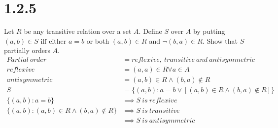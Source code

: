 \documentclass{article}
\begin{document}
\section*{1.2.5}
Let $R$ be any transitive relation over a set $A$. Define $S$ over $A$ by putting $(a,b) \in S$ iff either $a = b$ or both $(a,b) \in R$ and $\neg (b,a) \in R$. Show that $S$ partially orders $A$.
\begin{align*}
    Partial\ order &= reflexive,\ transitive\ and\ antisymmetric\\
    reflexive &= (a, a) \in R \forall a \in A \\
    antisymmetric &= (a,b) \in R \wedge (b,a) \notin R\\
    S &= \{(a, b): a = b \vee [(a,b) \in R \wedge (b,a) \notin R ]\}\\
    \{(a, b) : a = b\} &\implies S\ is\ reflexive\\
    \{(a, b) :(a,b) \in R \wedge (b,a) \notin R\} &\implies S\ is\ transitive\\
    &\implies S\ is\ antisymmetric
\end{align*}
\end{document}
